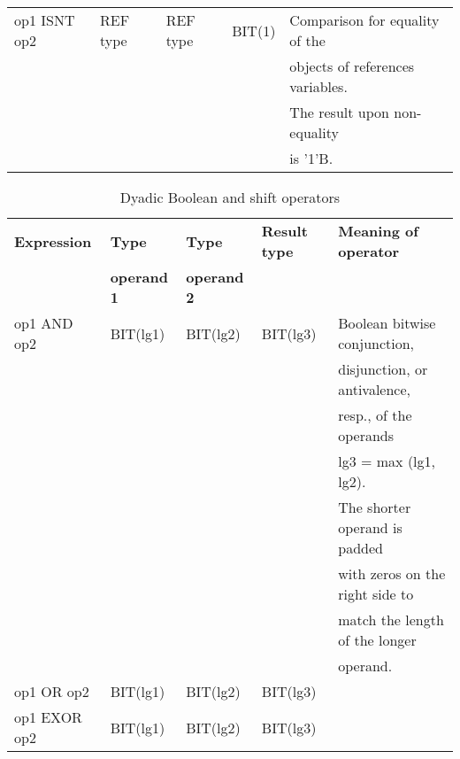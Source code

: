 \begin{table}
\begin{center}
\begin{tabular}{|l|l|l|l|l|}
op1 ISNT op2     & REF type        & REF type        & BIT(1)               & Comparison for equality of the\\
                 &                 &                 &                      & objects of references variables.\\
                 &                 &                 &                      & The result upon non-equality\\
                 &                 &                 &                      & is '1'B.\\
\hline
\end{tabular}
\end{center}
\end{table}

\begin{table} %
\begin{center}
\caption{Dyadic Boolean and shift operators}
\label{tab_dyadic_boolean_shift}
\vspace{5mm}
\begin{tabular}{|l|l|l|l|l|}
\hline
{\bf Expression} & {\bf Type}      & {\bf Type}      & {\bf Result type} & {\bf Meaning of operator}\\
                 & {\bf operand 1} & {\bf operand 2} &                   & \\ \hline

op1 AND op2      & BIT(lg1)        & BIT(lg2)        & BIT(lg3)          & Boolean bitwise conjunction,\\  
                 &                 &                 &                   & disjunction, or antivalence,\\
                 &                 &                 &                   & resp., of the operands\\
                 &                 &                 &                   & lg3 = max (lg1, lg2).\\
                 &                 &                 &                   & The shorter operand is padded\\
                 &                 &                 &                   & with zeros on the right side to\\
                 &                 &                 &                   & match the length of the longer\\
                 &                 &                 &                   & operand.\\ \cline{1-4}
op1 OR op2       & BIT(lg1)        & BIT(lg2)        & BIT(lg3)          & \\ \cline{1-4}
op1 EXOR op2     & BIT(lg1)        & BIT(lg2)        & BIT(lg3)          & \\ \hline


\end{tabular}
\end{center}
\end{table}
